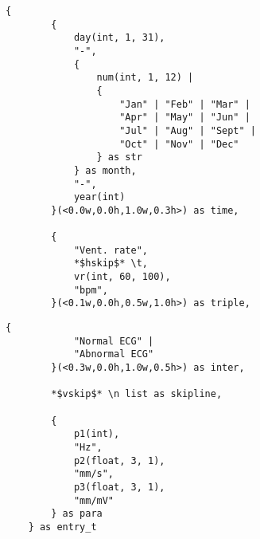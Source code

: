 \newsavebox{\absflisting}
\begin{lrbox}{\absflisting}%
\begin{lstlisting}[basicstyle=\tiny,]
    {
        {
            day(int, 1, 31),
            "-",
            {
                num(int, 1, 12) |
                {
                    "Jan" | "Feb" | "Mar" |
                    "Apr" | "May" | "Jun" |
                    "Jul" | "Aug" | "Sept" |
                    "Oct" | "Nov" | "Dec"
                } as str
            } as month,
            "-",
            year(int)
        }(<0.0w,0.0h,1.0w,0.3h>) as time,

        {
            "Vent. rate",
            *$hskip$* \t,
            vr(int, 60, 100),
            "bpm",
        }(<0.1w,0.0h,0.5w,1.0h>) as triple,
\end{lstlisting}
\end{lrbox}





\newsavebox{\absslisting}
\begin{lrbox}{\absslisting}
\begin{lstlisting}[basicstyle=\tiny,]
        {
            "Normal ECG" |
            "Abnormal ECG"
        }(<0.3w,0.0h,1.0w,0.5h>) as inter,

        *$vskip$* \n list as skipline,

        {
            p1(int),
            "Hz",
            p2(float, 3, 1),
            "mm/s",
            p3(float, 3, 1),
            "mm/mV"
        } as para
    } as entry_t
\end{lstlisting}
\end{lrbox}

